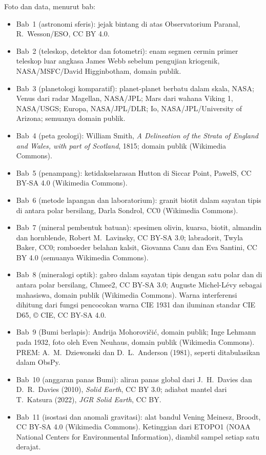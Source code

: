 \bigskip
\noindent Foto dan data, menurut bab:
\begin{itemize}\small
  \item Bab~1 (astronomi sferis): jejak bintang di atas Observatorium Paranal, R.~Wesson/ESO, CC BY 4.0.
  \item Bab~2 (teleskop, detektor dan fotometri): enam segmen cermin primer teleskop luar angkasa James Webb sebelum pengujian kriogenik, NASA/MSFC/David Higginbotham, domain publik.
  \item Bab~3 (planetologi komparatif): planet-planet berbatu dalam skala, NASA; Venus dari radar Magellan, NASA/JPL; Mars dari wahana Viking 1, NASA/USGS; Europa, NASA/JPL/DLR; Io, NASA/JPL/University of Arizona; semuanya domain publik.
  \item Bab~4 (peta geologi): William Smith, \emph{A Delineation of the Strata of England and Wales, with part of Scotland}, 1815; domain publik (Wikimedia Commons).
  \item Bab~5 (penampang): ketidakselarasan Hutton di Siccar Point, PawełS, CC BY-SA 4.0 (Wikimedia Commons).
  \item Bab~6 (metode lapangan dan laboratorium): granit biotit dalam sayatan tipis di antara polar bersilang, Darla Sondrol, CC0 (Wikimedia Commons).
  \item Bab~7 (mineral pembentuk batuan): spesimen olivin, kuarsa, biotit, almandin dan hornblende, Robert M.~Lavinsky, CC BY-SA 3.0; labradorit, Twyla Baker, CC0; romboeder belahan kalsit, Giovanna Canu dan Eva Santini, CC BY 4.0 (semuanya Wikimedia Commons).
  \item Bab~8 (mineralogi optik): gabro dalam sayatan tipis dengan satu polar dan di antara polar bersilang, Chmee2, CC BY-SA 3.0; Auguste Michel-Lévy sebagai mahasiswa, domain publik (Wikimedia Commons). Warna interferensi dihitung dari fungsi pencocokan warna CIE 1931 dan iluminan standar CIE D65, \copyright{} CIE, CC BY-SA 4.0.
  \item Bab~9 (Bumi berlapis): Andrija Mohorovičić, domain publik; Inge Lehmann pada 1932, foto oleh Even Neuhaus, domain publik (Wikimedia Commons). PREM: A.~M.~Dziewonski dan D.~L.~Anderson (1981), seperti ditabulasikan dalam ObsPy.
  \item Bab~10 (anggaran panas Bumi): aliran panas global dari J.~H.~Davies dan D.~R.~Davies (2010), \emph{Solid Earth}, CC BY 3.0; adiabat mantel dari T.~Katsura (2022), \emph{JGR Solid Earth}, CC BY.
  \item Bab~11 (isostasi dan anomali gravitasi): alat bandul Vening Meinesz, Broodt, CC BY-SA 4.0 (Wikimedia Commons). Ketinggian dari ETOPO1 (NOAA National Centers for Environmental Information), diambil sampel setiap satu derajat.

\end{itemize}
